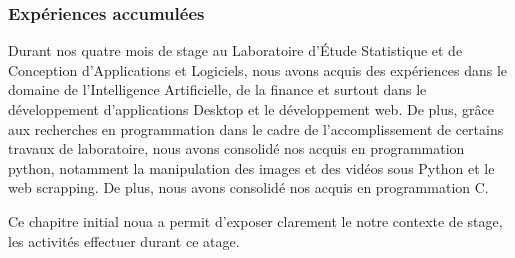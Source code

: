 \subsubsection{Expériences accumulées}
\par{
    Durant nos quatre mois de stage au Laboratoire d'Étude Statistique 
    et de Conception d'Applications et Logiciels, nous avons acquis des 
    expériences dans le domaine de l'Intelligence Artificielle, de la 
    finance et surtout dans le développement d'applications Desktop et 
    le développement web. De plus, grâce aux recherches en programmation 
    dans le cadre de l'accomplissement de certains travaux de laboratoire, 
    nous avons consolidé nos acquis en programmation python, notamment la 
    manipulation des images et des vidéos sous Python et le web scrapping. 
    De plus, nous avons consolidé nos acquis en programmation C.
}


Ce chapitre initial noua a permit d'exposer clarement le notre 
contexte de stage, les activités effectuer durant ce atage.

